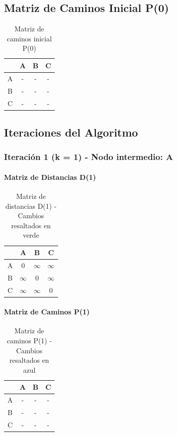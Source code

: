 \documentclass[12pt]{article}
\begin{document}
\clearpage
\subsection{Matriz de Caminos Inicial P(0)}
\begin{table}[h!]
\centering
\begin{tabular}{|c|c|c|c|}
\hline
 & A & B & C \\\hline
A & - & - & - \\\hline
B & - & - & - \\\hline
C & - & - & - \\\hline
\end{tabular}
\caption{Matriz de caminos inicial P(0)}
\end{table}

\clearpage
\subsection{Iteraciones del Algoritmo}
\subsubsection{Iteración 1 (k = 1) - Nodo intermedio: A}
\paragraph{Matriz de Distancias D(1)}
\begin{table}[h!]
\centering
\begin{tabular}{|c|c|c|c|}
\hline
 & A & B & C \\\hline
A & 0 & $\infty$ & $\infty$ \\\hline
B & $\infty$ & 0 & $\infty$ \\\hline
C & $\infty$ & $\infty$ & 0 \\\hline
\end{tabular}
\caption{Matriz de distancias D(1) - Cambios resaltados en verde}
\end{table}

\paragraph{Matriz de Caminos P(1)}
\begin{table}[h!]
\centering
\begin{tabular}{|c|c|c|c|}
\hline
 & A & B & C \\\hline
A & - & - & - \\\hline
B & - & - & - \\\hline
C & - & - & - \\\hline
\end{tabular}
\caption{Matriz de caminos P(1) - Cambios resaltados en azul}
\end{table}
\end{document}
